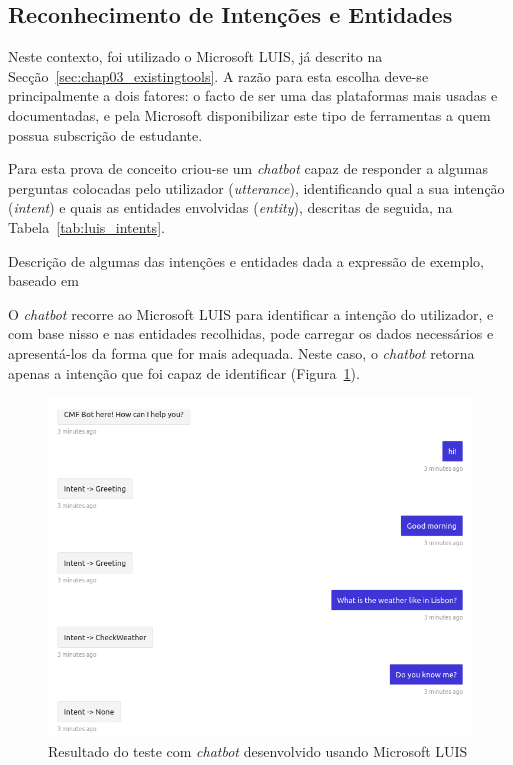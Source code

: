 \subsection{Reconhecimento de Intenções e Entidades}
Neste contexto, foi utilizado o Microsoft LUIS, já descrito na Secção~\ref{sec:chap03_existingtools}. A razão para esta escolha deve-se principalmente a dois fatores: o facto de ser uma das plataformas mais usadas e documentadas, e pela Microsoft disponibilizar este tipo de ferramentas a quem possua subscrição de estudante.

Para esta prova de conceito criou-se um \textit{chatbot} capaz de responder a algumas perguntas colocadas pelo utilizador (\textit{utterance}), identificando qual a sua intenção (\textit{intent}) e quais as entidades envolvidas (\textit{entity}), descritas de seguida, na Tabela~\ref{tab:luis_intents}.

\begin{table}[!ht]
\caption{Descrição de algumas das intenções e entidades dada a expressão de exemplo, baseado em~\textcite[Concepts]{microsoft_luis_official}}
\label{tab:luis_intents}
\centering
\resizebox{\textwidth}{!}{
\renewcommand{\arraystretch}{1.3}
\footnotesize

}
\end{table}

O \textit{chatbot} recorre ao Microsoft LUIS para identificar a intenção do utilizador, e com base nisso e nas entidades recolhidas, pode carregar os dados necessários e apresentá-los da forma que for mais adequada. Neste caso, o \textit{chatbot} retorna apenas a intenção que foi capaz de identificar (Figura~\ref{fig:chatbotexample}).

\begin{figure}[!ht]
\centering
\includegraphics[width=.9\textwidth]{ch03/assets/chatbot.png}
\caption{Resultado do teste com \textit{chatbot} desenvolvido usando Microsoft LUIS}
\label{fig:chatbotexample}
\end{figure}

